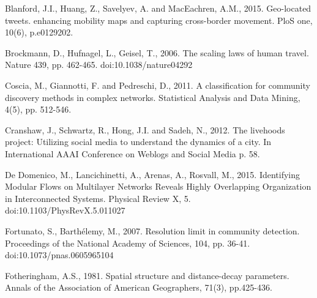 \documentclass[]{tGIS2e}
\begin{document}



\begin{thebibliography}{9}

Blanford, J.I., Huang, Z., Savelyev, A. and MacEachren, A.M., 2015. Geo-located tweets. enhancing mobility maps and capturing cross-border movement. PloS one, 10(6), p.e0129202.

Brockmann, D., Hufnagel, L., Geisel, T., 2006. The scaling laws of human travel. Nature 439, pp. 462-465. doi:10.1038/nature04292

Coscia, M., Giannotti, F. and Pedreschi, D., 2011. A classification for community discovery methods in complex networks. Statistical Analysis and Data Mining, 4(5), pp. 512-546.

Cranshaw, J., Schwartz, R., Hong, J.I. and Sadeh, N., 2012. The livehoods project: Utilizing social media to understand the dynamics of a city. In International AAAI Conference on Weblogs and Social Media p. 58.

De Domenico, M., Lancichinetti, A., Arenas, A., Rosvall, M., 2015. Identifying Modular Flows on Multilayer Networks Reveals Highly Overlapping Organization in Interconnected Systems. Physical Review X, 5. doi:10.1103/PhysRevX.5.011027

Fortunato, S., Barthélemy, M., 2007. Resolution limit in community detection. Proceedings of the National Academy of Sciences, 104, pp. 36-41. doi:10.1073/pnas.0605965104

Fotheringham, A.S., 1981. Spatial structure and distance-decay parameters. Annals of the Association of American Geographers, 71(3), pp.425-436.


\end{thebibliography}
\end{document}
